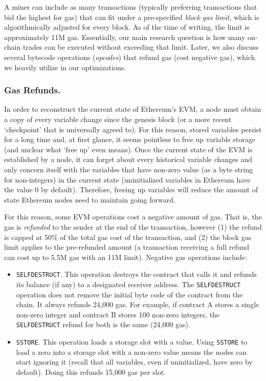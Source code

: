 A miner can include as many transactions (typically preferring transactions that bid the highest for gas) that can fit under a pre-specified \textit{block gas limit}, which is algorithmically adjusted for every block. As of the time of writing, the limit is approximately 11M gas. Essentially, our main research question is how many on-chain trades can be executed without exceeding that limit. Later, we also discuss several bytecode operations (\emph{opcodes}) that refund gas (\ie cost negative gas), which we heavily utilize in our optimizations.

\subsubsection{Gas Refunds.} 

In order to reconstruct the current state of Ethereum's EVM, a node must obtain a copy of every variable change since the genesis block (or a more recent `checkpoint' that is universally agreed to). For this reason, stored variables persist for a long time and, at first glance, it seems pointless to free up variable storage (and unclear what `free up' even means). Once the current state of the EVM is established by a node, it can forget about every historical variable changes and only concern itself with the variables that have non-zero value (as a byte string for non-integers) in the current state (uninitialized variables in Ethereum have the value 0 by default). Therefore, freeing up variables will reduce the amount of state Ethereum nodes need to maintain going forward.

For this reason, some EVM operations cost a negative amount of gas. That is, the gas is \textit{refunded} to the sender at the end of the transaction, however (1) the refund is capped at 50\% of the total gas cost of the transaction, and (2) the block gas limit applies to the pre-refunded amount (\ie a transaction receiving a full refund can cost up to 5.5M gas with an 11M limit). Negative gas operations include:

\begin{itemize}

\item \texttt{SELFDESTRUCT}. This operation destroys the contract that calls it and refunds its balance (if any) to a designated receiver address. The  \texttt{SELFDESTRUCT} operation does not remove the initial byte code of the contract from the chain. It always refunds 24,000 gas. For example, if contract A stores a single non-zero integer and contract B stores 100 non-zero integers, the \texttt{SELFDESTRUCT} refund for both is the same (24,000 gas).


\item \texttt{SSTORE}. This operation loads a storage slot with a value. Using \texttt{SSTORE} to load a zero into a storage slot with a non-zero value means the nodes can start ignoring it (recall that all variables, even if uninitialized, have zero by default). Doing this refunds 15,000 gas per slot.

\end{itemize}

